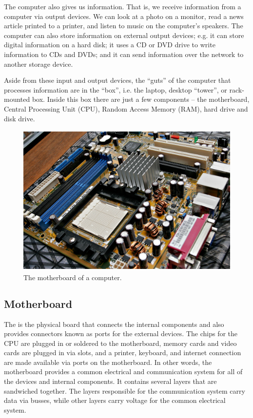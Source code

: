The computer also gives us information.  That is, we receive
information from a computer via output devices.  We can look at a
photo on a monitor, read a news article printed to a printer, and
listen to music on the computer's speakers. The computer can also
store information on external output devices; e.g. it can store
digital information on a hard disk; it uses a CD or DVD drive to write
information to CDs and DVDs; and it can send information over the
network to another storage device.

Aside from these input and output devices, the ``guts'' of the
computer that processes information are in the ``box'', i.e. the
laptop, desktop ``tower'', or rack-mounted box.  Inside this box there
are just a few components -- the motherboard, Central Processing Unit
(CPU), Random Access Memory (RAM), hard drive and disk drive.

\begin{figure}
\begin{center}
\includegraphics[height=3in]{computerIntro/images/motherboardHiRes.jpg}
\caption{The motherboard of a computer.}\label{fig:thinkpad}
\end{center}
\end{figure}

\subsection{Motherboard} The  is the physical board
that connects the internal components and also provides connectors
known as ports for the external devices.  The chips for the CPU are
plugged in or soldered to the motherboard, memory cards and video
cards are plugged in via slots, and a printer, keyboard, and internet
connection are made available via ports on the motherboard.  In other
words, the motherboard provides a common electrical and communication
system for all of the devices and internal components.  It contains
several layers that are sandwiched together.  The layers responsible
for the communication system carry data via busses, while other layers
carry voltage for the common electrical system.

